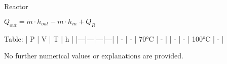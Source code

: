 Reactor  

\( Q_{out} = \dot{m} \cdot h_{out} - \dot{m} \cdot h_{in} + Q_{R} \)  

Table:  
| P | V | T | h |  
|---|---|---|---|  
| - | - | 70°C | - |  
| - | - | 100°C | - |  

No further numerical values or explanations are provided.
